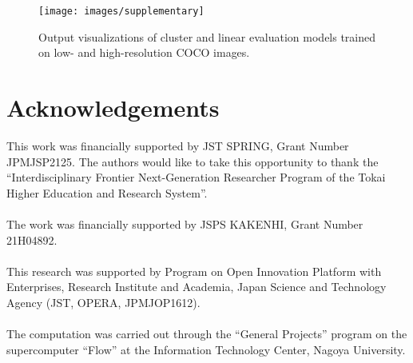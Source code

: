 \documentclass{bmvc2k}
\begin{document}
\begin{figure}
\begin{center}
\texttt{[image: images/supplementary]}
\end{center}
   \caption{Output visualizations of cluster and linear evaluation models trained on low-
and high-resolution COCO images.}
\label{fig:supplementary_viz}
\end{figure}

\section*{Acknowledgements}

This work was financially supported by JST SPRING, Grant Number JPMJSP2125. The authors would like to take this opportunity to thank the ``Interdisciplinary Frontier Next-Generation Researcher Program of the Tokai Higher Education and Research System''.
\\
\\
The work was financially supported by JSPS KAKENHI, Grant Number 21H04892.
\\
\\
This research was supported by Program on Open Innovation Platform with Enterprises, Research Institute and Academia, Japan Science and Technology Agency (JST, OPERA, JPMJOP1612).
\\
\\
The computation was carried out through the ``General Projects'' program on the supercomputer ``Flow'' at the Information Technology Center, Nagoya University.


\end{document}
